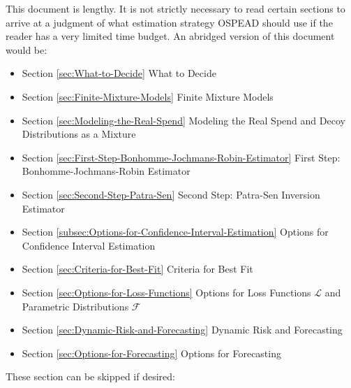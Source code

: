 \documentclass[english]{article}
\begin{document}
This document is lengthy. It is not strictly necessary to read certain
sections to arrive at a judgment of what estimation strategy OSPEAD
should use if the reader has a very limited time budget. An abridged
version of this document would be:
\begin{itemize}
\item Section \ref{sec:What-to-Decide} What to Decide
\item Section \ref{sec:Finite-Mixture-Models} Finite Mixture Models
\item Section \ref{sec:Modeling-the-Real-Spend} Modeling the Real Spend
and Decoy Distributions as a Mixture
\item Section \ref{sec:First-Step-Bonhomme-Jochmans-Robin-Estimator} First
Step: Bonhomme-Jochmans-Robin Estimator
\item Section \ref{sec:Second-Step-Patra-Sen} Second Step: Patra-Sen Inversion
Estimator
\item Section \ref{subsec:Options-for-Confidence-Interval-Estimation} Options
for Confidence Interval Estimation
\item Section \ref{sec:Criteria-for-Best-Fit} Criteria for Best Fit
\item Section \ref{sec:Options-for-Loss-Functions} Options for Loss Functions
$\mathcal{L}$ and Parametric Distributions $\mathcal{F}$
\item Section \ref{sec:Dynamic-Risk-and-Forecasting} Dynamic Risk and Forecasting
\item Section \ref{sec:Options-for-Forecasting} Options for Forecasting
\end{itemize}
These section can be skipped if desired:
\end{document}
